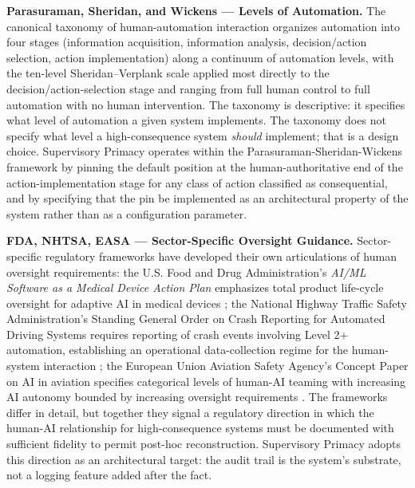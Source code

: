 \textbf{Parasuraman, Sheridan, and Wickens --- Levels of Automation.}
The canonical taxonomy of human-automation interaction \cite{ref2} organizes
automation into four stages (information acquisition, information
analysis, decision/action selection, action implementation) along a
continuum of automation levels, with the ten-level Sheridan--Verplank
scale applied most directly to the decision/action-selection stage and
ranging from full human control to full automation with no human
intervention. The taxonomy is descriptive: it specifies what level of
automation a given system implements. The taxonomy does not specify what
level a high-consequence system \emph{should} implement; that is a
design choice. Supervisory Primacy operates within the
Parasuraman-Sheridan-Wickens framework by pinning the default position
at the human-authoritative end of the action-implementation stage for
any class of action classified as consequential, and by specifying that
the pin be implemented as an architectural property of the system rather
than as a configuration parameter.

\textbf{FDA, NHTSA, EASA --- Sector-Specific Oversight Guidance.}
Sector-specific regulatory frameworks have developed their own
articulations of human oversight requirements: the U.S. Food and Drug
Administration's \emph{AI/ML Software as a Medical Device Action Plan}
emphasizes total product life-cycle oversight for adaptive AI in medical
devices \cite{ref6}; the National Highway Traffic Safety Administration's
Standing General Order on Crash Reporting for Automated Driving Systems
requires reporting of crash events involving Level 2+ automation,
establishing an operational data-collection regime for the human-system
interaction \cite{ref7}; the European Union Aviation Safety Agency's Concept
Paper on AI in aviation specifies categorical levels of human-AI teaming
with increasing AI autonomy bounded by increasing oversight requirements
\cite{ref8}. The frameworks differ in detail, but together they signal a
regulatory direction in which the human-AI relationship for
high-consequence systems must be documented with sufficient fidelity to
permit post-hoc reconstruction. Supervisory Primacy adopts this
direction as an architectural target: the audit trail is the system's
substrate, not a logging feature added after the fact.

